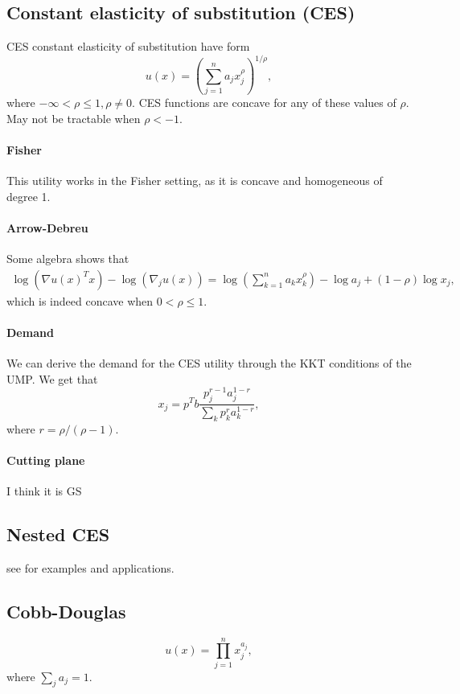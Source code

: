 \documentclass[12pt]{article}
\begin{document}
\subsection{Constant elasticity of substitution (CES)}
CES constant elasticity of substitution have form
\[
u(x) = \left(\sum_{j=1}^n a_j x_j^\rho \right)^{1/\rho},
\]
where $-\infty < \rho \leq 1, \rho \neq 0$.
CES functions are concave for any of these values of $\rho$.
May not be tractable when $\rho < -1$.

\paragraph{Fisher}
This utility works in the Fisher setting, as it is concave and homogeneous of
degree 1.

\paragraph{Arrow-Debreu}
Some algebra shows that 
\begin{align*}
\log(\nabla u(x)^T x) - \log(\nabla_j u(x)) =
\log\left(\sum_{k=1}^n a_k x_k^\rho \right) - \log a_j + (1-\rho) \log x_j,
\end{align*}
which is indeed concave when $0 < \rho \leq 1$.


\paragraph{Demand}
We can derive the demand for the CES utility through the KKT conditions of the
UMP. We get that
\[
x_j = p^Tb\frac{p_j^{r-1} a_j^{1-r}}{\sum_k p_k^r a_k^{1-r}},
\]
where $r = \rho/(\rho-1)$.

\paragraph{Cutting plane} I think it is GS

\subsection{Nested CES}
see \cite{shoven1992applying} for examples and applications.

\subsection{Cobb-Douglas}
\[
u(x) = \prod_{j=1}^{n} x_j^{a_j},
\]
where $\sum_j a_j = 1$.
\end{document}
